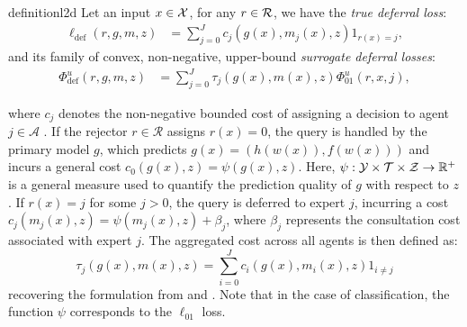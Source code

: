\begin{restatable}{definition}{l2d}\label{def_l2d} 
Let an input \( x\in\mathcal{X} \), for any \( r\in\mathcal{R} \), we have the \textit{true deferral loss}:
\begin{equation*}
    \begin{aligned} 
    \ell_{\text{def}}(r,g,m,z) & = \sum_{j=0}^Jc_j(g(x),m_j(x),z)1_{r(x)=j},
    \end{aligned}
\end{equation*}
and its family of convex, non-negative, upper-bound \textit{surrogate deferral losses}:
\begin{equation*}
    \begin{aligned}
    \Phi_{\text{def}}^u(r,g,m,z) & = \sum_{j=0}^J\tau_j(g(x),m(x),z)\Phi_{01}^u(r,x,j),
    \end{aligned}
\end{equation*}
\end{restatable}
where \( c_j \) denotes the non-negative bounded cost of assigning a decision to agent \( j \in \mathcal{A} \) \citep{madras2018predict}. If the rejector \( r \in \mathcal{R} \) assigns \( r(x) = 0 \), the query is handled by the primary model \( g \), which predicts \( g(x) = (h(w(x)), f(w(x))) \) and incurs a general cost \( c_0(g(x), z) = \psi(g(x), z) \). Here, \(\psi:\mathcal{Y}\times\mathcal{T}\times\mathcal{Z}\to \mathbb{R}^+\) is a general measure used to quantify the prediction quality of \( g \) with respect to \( z \). If \( r(x) = j \) for some \( j > 0 \), the query is deferred to expert \( j \), incurring a cost \( c_j(m_j(x), z) = \psi(m_j(x), z) + \beta_j \), where \( \beta_j \) represents the consultation cost associated with expert \( j \). The aggregated cost across all agents is then defined as:
\begin{equation}\label{eq:tau}
    \tau_j(g(x),m(x), z) =  \sum_{i=0}^J c_i(g(x),m_i(x), z) 1_{i \neq j}
\end{equation}
recovering the formulation from \citet{mao2024regressionmultiexpertdeferral} and \citet{montreuil2024twostagelearningtodefermultitasklearning}. Note that in the case of classification, the function $\psi$ corresponds to the $\ell_{01}$ loss. 


